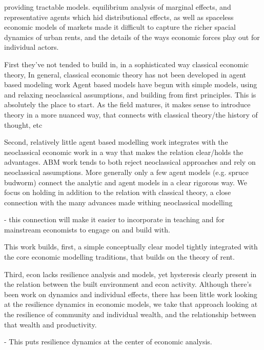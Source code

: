 providing tractable models.  equilibrium analysis of marginal effects, and representative agents which hid distributional effects, as well as spaceless economic models of markets made it difficult to capture the richer spacial dynamics of urban rents, and the details of the ways economic forces play out for individual actors.

First they've not tended to build in, in a sophisticated way classical economic theory,
In general, classical economic theory has not been developed in agent based modeling work
Agent based models have begun with simple models, using and relaxing neoclassical assumptions, and building from first principles. This is absolutely the place to start. As the field matures, it makes sense to introduce theory in a more nuanced way, that connects with classical theory/the history of thought, etc

Second, relatively little agent based modelling work integrates with the neoclassical economic work in a way that makes the relation clear/holds the advantages. ABM work tends to both reject neoclassical approaches and rely on neoclassical assumptions.
More generally only a few agent models (e.g. spruce budworm) connect the analytic and agent models in a clear rigorous way. We focus on holding in addition to the relation with classical theory, a close connection with the many advances made withing neoclassical modelling

- this connection will make it easier to incorporate in teaching and for mainstream economists to engage on and build with.

This work builds, first, a simple conceptually clear model tightly integrated with the core economic modelling traditions, that builds on the theory of rent.


Third, econ lacks resilience analysis and models, yet hysteresis clearly present in the relation between the built environment and econ activity. Although there's been work on dynamics and individual effects, there has been little work looking at the resilience dynamics in economic models, we take that approach looking at the resilience of community and individual wealth, and the relationship between that wealth and productivity. 

- This puts resilience dynamics at the center of economic analysis.

